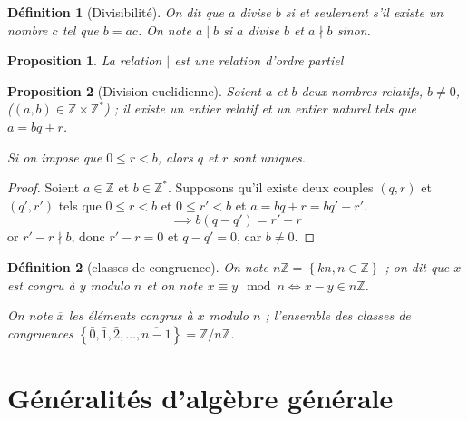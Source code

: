 \documentclass[french]{article}
\newtheorem{definition}{Définition}
\newtheorem{proposition}{Proposition}
\newcommand{\Z}{\mathbb{Z}}
\begin{document}
  \begin{definition}[Divisibilité]
    On dit que $a$ divise $b$ si et seulement s'il existe un nombre $c$
    tel que $b=ac$. On note $a\mid b$ si $a$ divise $b$ et $a \nmid
    b$ sinon.
  \end{definition}
  \begin{proposition}
    La relation $\mid$ est une relation d'ordre partiel
  \end{proposition}

  \begin{proposition}[Division euclidienne]
    Soient $a$ et $b$ deux nombres relatifs, $b\neq 0$, ($(a,b)\in
    \Z\times\Z^*$) ; il existe un entier relatif et un entier naturel
    tels que $a=bq+r$.

    Si on impose que $0\leq r<b$, alors $q$ et $r$ sont uniques.
  \end{proposition}

  \begin{proof}
    Soient $a\in\Z$ et $b\in\Z^*$. Supposons qu'il existe deux couples
    $(q,r)$ et $(q',r')$ tels que $0 \leq r<b$ et $0\leq r'<b$ et $a =
    bq + r = bq' + r'$.  \[ \implies b(q - q') = r' - r \] or $r' - r
    \nmid b$, donc $r' - r = 0$ et $q -q'=0$, car $b\neq 0$.
  \end{proof}

  \begin{definition}[classes de congruence]
    On note $n\Z = \left\lbrace kn, n\in\Z \right\rbrace$ ; on dit que
    $x$ est congru à $y$ modulo $n$ et on note $x\equiv y \mod n \iff
    x-y \in n\Z$.

    On note $\overline{x}$ les éléments congrus à $x$ modulo $n$ ;
    l'ensemble des classes de congruences $\left\lbrace \bar0, \bar1,
    \bar2, …, \overline{n-1} \right\rbrace = \Z/n\Z$.
  \end{definition}

\section{Généralités d'algèbre générale}
\end{document}
